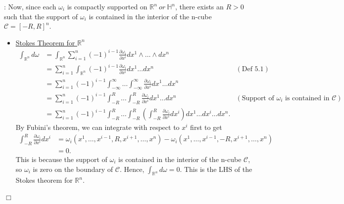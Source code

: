\documentclass{article}
\theoremstyle{definition}
\theoremstyle{named}
\def\endproofmark{$\Box$}
\newenvironment{proof}{\par\noindent{\bf Proof}:}{\endproofmark\smallskip}
\begin{document}
\begin{proof}
    Now, since each $\omega_i$ is compactly supported on $\mathbb{R}^n \ or \ \mathbb{H}^n$, there exists an $R > 0$ such that the support of $\omega_i$ is contained in the interior of the n-cube $\mathcal{C} = [-R, R]^n$. 
    \begin{itemize}
        \item \underline{Stokes Theorem for $\mathbb{R}^n$}
        \begin{align*}
            \int_{\mathbb{R}^n} d\omega &= \int_{\mathbb{R}^n} \sum_{i=1}^n (-1)^{i-1} \frac{\partial \omega_i}{\partial x^i} dx^1 \wedge \ldots \wedge dx^n \\
            &= \sum_{i=1}^n \int_{\mathbb{R}^n}  (-1)^{i-1} \frac{\partial \omega_i}{\partial x^i} dx^1 \ldots dx^n & (\text{Def 5.1}) \\
            &= \sum_{i=1}^n (-1)^{i-1} \int_{-\infty}^{\infty} \ldots \int_{-\infty}^{\infty}  \frac{\partial \omega_i}{\partial x^i} dx^1 \ldots dx^n \\
            &= \sum_{i=1}^n (-1)^{i-1}\int_{-R}^R \ldots \int_{-R}^R  \frac{\partial \omega_i}{\partial x^i} dx^1 \ldots dx^n & (\text{Support of } \omega_i \text{ is contained in } \mathcal{C}) \\
            &= \sum_{i=1}^n (-1)^{i-1} \int_{-R}^R \ldots \int_{-R}^R  \left(
                \int_{-R}^{R} \frac{\partial \omega_i}{\partial x^i} dx^i
            \right) dx^1 \ldots \widehat{dx^i} \ldots dx^n .
        \end{align*}
        By Fubini's theorem, we can integrate with respect to $x^i$ first to get
        \begin{align*}
            \int_{-R}^{R} \frac{\partial \omega_i}{\partial x^i} dx^i &= \omega_i(x^1, \ldots, x^{i-1}, R, x^{i+1}, \ldots, x^n) - \omega_i(x^1, \ldots, x^{i-1}, -R, x^{i+1}, \ldots, x^n) \\
            &= 0.
        \end{align*}
        This is because the support of $\omega_i$ is contained in the interior of the n-cube $\mathcal{C}$, so $\omega_i$ is zero on the boundary of $\mathcal{C}$. Hence, $\int_{\mathbb{R}^n} d\omega = 0$. This is the LHS of the Stokes theorem for $\mathbb{R}^n$.


\end{itemize}
\end{proof}
\end{document}
